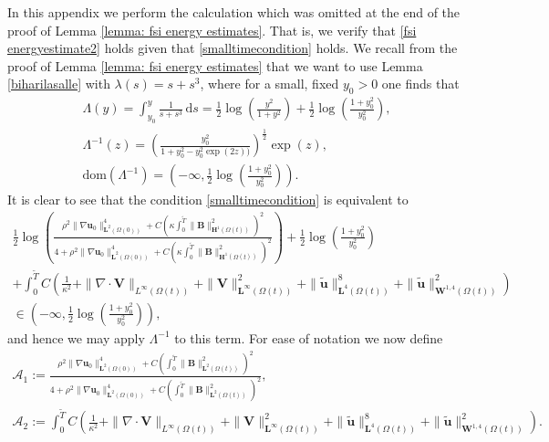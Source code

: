 \documentclass[a4paper]{amsart}
\numberwithin{equation}{section}
\newcommand{\grad}{\nabla}
\newcommand{\Div}{\nabla \cdot}
\theoremstyle{plain}
\newcommand{\mbf}[1]{\mathbf{#1}}
\begin{document}
In this appendix we perform the calculation which was omitted at the end of the proof of Lemma \ref{lemma: fsi energy estimates}.
That is, we verify that \eqref{fsi energyestimate2} holds given that \eqref{smalltimecondition} holds.
We recall from the proof of Lemma \ref{lemma: fsi energy estimates} that we want to use Lemma \ref{biharilasalle} with $\lambda(s) = s + s^3$, where for a small, fixed $y_0 > 0$ one finds that 
\begin{gather*}
\Lambda(y) = \int_{y_0}^y \frac{1}{s + s^3} \, \mathrm{d}s = \frac{1}{2}\log\left(\frac{y^2}{1+y^2}\right) + \frac{1}{2}\log\left(\frac{1+y_0^2}{y_0^2}\right),\\
\Lambda^{-1}(z) = \left( \frac{y_0^2}{1 + y_0^2 - y_0^2\exp(2z))} \right)^{\frac{1}{2}} \exp(z),\\
\text{dom}(\Lambda^{-1}) = \left(-\infty, \frac{1}{2}\log\left(\frac{1+y_0^2}{y_0^2}\right)\right).
\end{gather*}
It is clear to see that the condition \eqref{smalltimecondition} is equivalent to 
\begin{multline*}
		\frac{1}{2} \log \left( \frac{\rho^2 \|\grad \mbf{u}_0\|_{\mbf{L}^2(\Omega(0))}^4 + C\left(\kappa \int_0^{\widetilde{T}} \|\mbf{B}\|_{\mbf{H}^1(\Omega(t))}^2 \right)^2}{4 + \rho^2 \|\grad \mbf{u}_0\|_{\mbf{L}^2(\Omega(0))}^4 + C\left(\kappa\int_0^{\widetilde{T}} \|\mbf{B}\|_{\mbf{H}^1(\Omega(t))}^2 \right)^2} \right) + \frac{1}{2}\log\left(\frac{1+y_0^2}{y_0^2}\right)\\
        +\int_0^{\widetilde{T}}C \left(\frac{1}{\kappa^2} + \|\Div\mbf{V}\|_{L^\infty(\Omega(t))} + \|\mbf{V}\|_{\mbf{L}^\infty(\Omega(t))}^2 +\|\widetilde{\mbf{u}}\|_{\mbf{L}^4(\Omega(t))}^8 +\|\widetilde{\mbf{u}}\|_{\mbf{W}^{1,4}(\Omega(t))}^2\right)\\
        \in \left(-\infty, \frac{1}{2}\log\left(\frac{1+y_0^2}{y_0^2}\right)\right),
\end{multline*}
and hence we may apply $\Lambda^{-1}$ to this term.
For ease of notation we now define 
\begin{gather*}
    \mathcal{A}_1 := \frac{\rho^2 \|\grad \mbf{u}_0\|_{\mbf{L}^2(\Omega(0))}^4 + C\left(\int_0^{\widetilde{T}} \|\mbf{B}\|_{\mbf{L}^2(\Omega(t))}^2 \right)^2}{4 + \rho^2 \|\grad \mbf{u}_0\|_{\mbf{L}^2(\Omega(0))}^4 + C\left(\int_0^{\widetilde{T}} \|\mbf{B}\|_{\mbf{L}^2(\Omega(t))}^2 \right)^2},\\
    \mathcal{A}_2 := \int_0^{\widetilde{T}}C \left( \frac{1}{\kappa^2} + \|\Div\mbf{V}\|_{L^\infty(\Omega(t))} + \|\mbf{V}\|_{\mbf{L}^\infty(\Omega(t))}^2 +\|\widetilde{\mbf{u}}\|_{\mbf{L}^4(\Omega(t))}^8 +\|\widetilde{\mbf{u}}\|_{\mbf{W}^{1,4}(\Omega(t))}^2\right).
\end{gather*}
\end{document}
